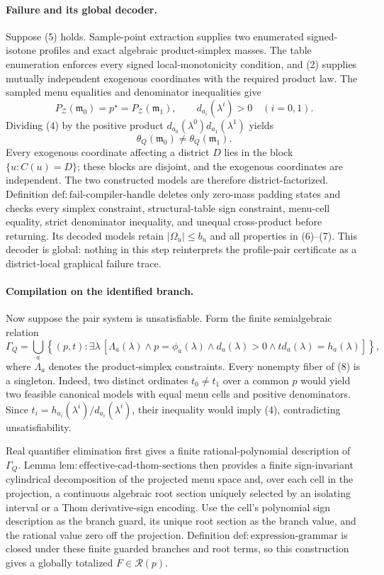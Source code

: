 \paragraph{Failure and its global decoder.}
Suppose (5) holds.  Sample-point extraction supplies two enumerated signed-isotone profiles and exact algebraic product-simplex masses.  The table enumeration enforces every signed local-monotonicity condition, and (2) supplies mutually independent exogenous coordinates with the required product law.  The sampled menu equalities and denominator inequalities give
\[
 P_{\mathcal Z}(\mathfrak m_0)=p^{\star}=P_{\mathcal Z}(\mathfrak m_1),
 \qquad
 d_{a_i}(\lambda^i)>0\quad(i=0,1).
\tag{6}
\]
Dividing (4) by the positive product \(d_{a_0}(\lambda^0)d_{a_1}(\lambda^1)\) yields
\[
 \theta_Q(\mathfrak m_0)\ne\theta_Q(\mathfrak m_1).
\tag{7}
\]
Every exogenous coordinate affecting a district \(D\) lies in the block \(\{u:C(u)=D\}\); these blocks are disjoint, and the exogenous coordinates are independent.  The two constructed models are therefore district-factorized.  Definition \(\mathrm{def:fail\text{-}compiler\text{-}handle}\) deletes only zero-mass padding states and checks every simplex constraint, structural-table sign constraint, menu-cell equality, strict denominator inequality, and unequal cross-product before returning.  Its decoded models retain \(|\Omega_u|\le b_u\) and all properties in (6)--(7).  This decoder is global: nothing in this step reinterprets the profile-pair certificate as a district-local graphical failure trace.

\paragraph{Compilation on the identified branch.}
Now suppose the pair system is unsatisfiable.  Form the finite semialgebraic relation
\[
 \Gamma_Q
 =\bigcup_a\left\{(p,t):\exists\lambda\,
 \left[
 \Lambda_a(\lambda)\wedge p=\phi_a(\lambda)
 \wedge d_a(\lambda)>0
 \wedge t d_a(\lambda)=h_a(\lambda)
 \right]\right\},
\tag{8}
\]
where \(\Lambda_a\) denotes the product-simplex constraints.  Every nonempty fiber of (8) is a singleton.  Indeed, two distinct ordinates \(t_0\ne t_1\) over a common \(p\) would yield two feasible canonical models with equal menu cells and positive denominators.  Since \(t_i=h_{a_i}(\lambda^i)/d_{a_i}(\lambda^i)\), their inequality would imply (4), contradicting unsatisfiability.

Real quantifier elimination first gives a finite rational-polynomial description of \(\Gamma_Q\).  Lemma \(\mathrm{lem:effective\text{-}cad\text{-}thom\text{-}sections}\) then provides a finite sign-invariant cylindrical decomposition of the projected menu space and, over each cell in the projection, a continuous algebraic root section uniquely selected by an isolating interval or a Thom derivative-sign encoding.  Use the cell's polynomial sign description as the branch guard, its unique root section as the branch value, and the rational value zero off the projection.  Definition \(\mathrm{def:expression\text{-}grammar}\) is closed under these finite guarded branches and root terms, so this construction gives a globally totalized \(F\in\mathcal R(p)\).

